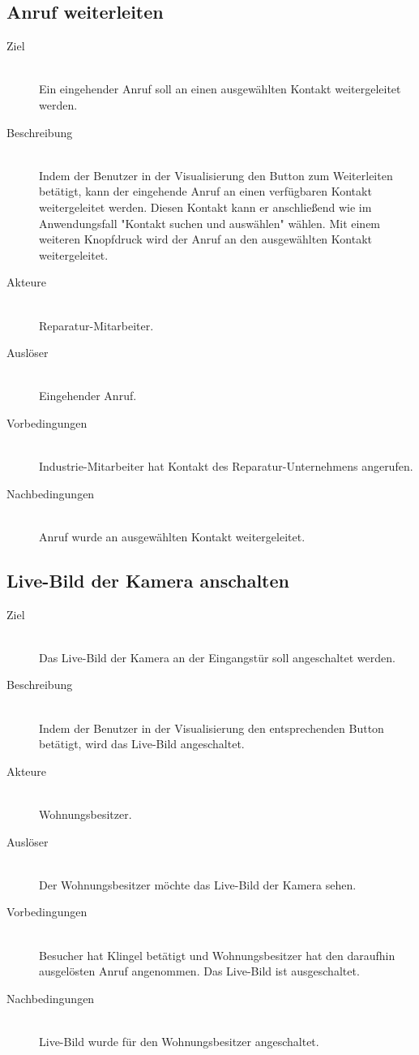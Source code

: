 \subsection{Anruf weiterleiten}\label{subsec:anruf-weiterleiten}
    \begin{description}
        \item[Ziel]\hfill \\
        Ein eingehender Anruf soll an einen ausgewählten Kontakt weitergeleitet werden.
        \item[Beschreibung]\hfill \\
        Indem der Benutzer in der Visualisierung den Button zum Weiterleiten betätigt, kann der eingehende Anruf an einen verfügbaren Kontakt weitergeleitet werden.
        Diesen Kontakt kann er anschließend wie im Anwendungsfall "Kontakt suchen und auswählen" wählen.
        Mit einem weiteren Knopfdruck wird der Anruf an den ausgewählten Kontakt weitergeleitet.
        \item[Akteure]\hfill \\
        Reparatur-Mitarbeiter.
        \item[Auslöser]\hfill \\
        Eingehender Anruf.
        \item[Vorbedingungen]\hfill \\
        Industrie-Mitarbeiter hat Kontakt des Reparatur-Unternehmens angerufen.
        \item[Nachbedingungen]\hfill \\
        Anruf wurde an ausgewählten Kontakt weitergeleitet.
        \end{description}

\subsection{Live-Bild der Kamera anschalten}\label{subsec:live-Bild-der-kamera-anschalten}
    \begin{description}
        \item[Ziel]\hfill \\
        Das Live-Bild der Kamera an der Eingangstür soll angeschaltet werden.
        \item[Beschreibung]\hfill \\
        Indem der Benutzer in der Visualisierung den entsprechenden Button betätigt, wird das Live-Bild angeschaltet.
        \item[Akteure]\hfill \\
        Wohnungsbesitzer.
        \item[Auslöser]\hfill \\
        Der Wohnungsbesitzer möchte das Live-Bild der Kamera sehen.
        \item[Vorbedingungen]\hfill \\
        Besucher hat Klingel betätigt und Wohnungsbesitzer hat den daraufhin ausgelösten Anruf angenommen.
        Das Live-Bild ist ausgeschaltet.
        \item[Nachbedingungen]\hfill \\
        Live-Bild wurde für den Wohnungsbesitzer angeschaltet.
        \end{description}


